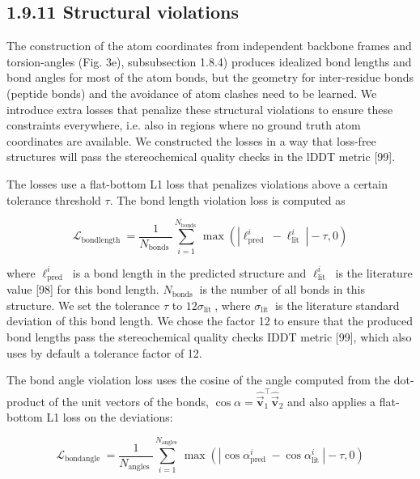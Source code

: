 \documentclass[10pt]{article}
\begin{document}
\subsection*{1.9.11 Structural violations}
The construction of the atom coordinates from independent backbone frames and torsion-angles (Fig. 3e), subsubsection 1.8.4) produces idealized bond lengths and bond angles for most of the atom bonds, but the geometry for inter-residue bonds (peptide bonds) and the avoidance of atom clashes need to be learned. We introduce extra losses that penalize these structural violations to ensure these constraints everywhere, i.e. also in regions where no ground truth atom coordinates are available. We constructed the losses in a way that loss-free structures will pass the stereochemical quality checks in the lDDT metric [99].

The losses use a flat-bottom L1 loss that penalizes violations above a certain tolerance threshold $\tau$. The bond length violation loss is computed as


\begin{equation*}
\mathcal{L}_{\text {bondlength }}=\frac{1}{N_{\text {bonds }}} \sum_{i=1}^{N_{\text {bonds }}} \max \left(\left|\ell_{\text {pred }}^{i}-\ell_{\text {lit }}^{i}\right|-\tau, 0\right) \tag{44}
\end{equation*}


where $\ell_{\text {pred }}^{i}$ is a bond length in the predicted structure and $\ell_{\text {lit }}^{i}$ is the literature value [98] for this bond length. $N_{\text {bonds }}$ is the number of all bonds in this structure. We set the tolerance $\tau$ to $12 \sigma_{\text {lit }}$, where $\sigma_{\text {lit }}$ is the literature standard deviation of this bond length. We chose the factor 12 to ensure that the produced bond lengths pass the stereochemical quality checks IDDT metric [99], which also uses by default a tolerance factor of 12.

The bond angle violation loss uses the cosine of the angle computed from the dot-product of the unit vectors of the bonds, $\cos \alpha=\hat{\overrightarrow{\mathbf{v}}}_{1}^{\top} \hat{\overrightarrow{\mathbf{v}}}_{2}$ and also applies a flat-bottom L1 loss on the deviations:


\begin{equation*}
\mathcal{L}_{\text {bondangle }}=\frac{1}{N_{\text {angles }}} \sum_{i=1}^{N_{\text {angles }}} \max \left(\left|\cos \alpha_{\text {pred }}^{i}-\cos \alpha_{\text {lit }}^{i}\right|-\tau, 0\right) \tag{45}
\end{equation*}
\end{document}
